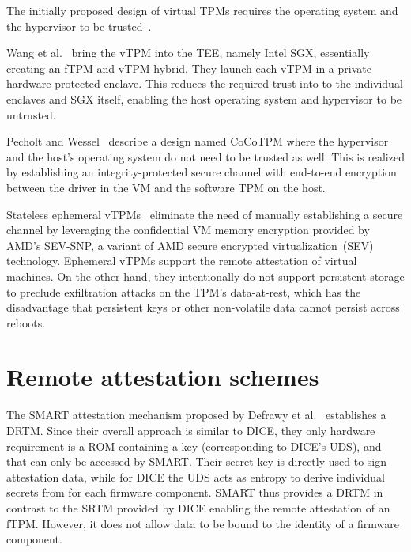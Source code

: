 The initially proposed design of virtual \acp{TPM} requires the operating system and the hypervisor to be trusted~\cite{268868}.

Wang et al.~\cite{Wang2019} bring the vTPM into the \ac{TEE}, namely Intel SGX, essentially creating an fTPM and vTPM hybrid.
They launch each vTPM in a private hardware-protected enclave.
This reduces the required trust into to the individual enclaves and SGX itself, enabling the host operating system and hypervisor to be untrusted.

Pecholt and Wessel~\cite{Pecholt2022} describe a design named CoCoTPM where the hypervisor and the host's operating system do not need to be trusted as well.
This is realized by establishing an integrity-protected secure channel with end-to-end encryption between the driver in the VM and the software TPM on the host.

Stateless ephemeral vTPMs~\cite{Narayanan2023} eliminate the need of manually establishing a secure channel by leveraging the confidential VM memory encryption provided by AMD's SEV-SNP, a variant of AMD secure encrypted virtualization~(SEV) technology.
Ephemeral vTPMs support the remote attestation of virtual machines.
On the other hand, they intentionally do not support persistent storage to preclude exfiltration attacks on the TPM's data-at-rest, which has the disadvantage that persistent keys or other non-volatile data cannot persist across reboots.

\section{Remote attestation schemes}



The SMART attestation mechanism proposed by Defrawy et al.~\cite{EURECOM+3536} establishes a \ac{DRTM}.
Since their overall approach is similar to \ac{DICE}, they only hardware requirement is a ROM containing a key (corresponding to DICE's \ac{UDS}), and that can only be accessed by SMART\@.
Their secret key is directly used to sign attestation data, while for \ac{DICE} the \ac{UDS} acts as entropy to derive individual secrets from for each firmware component.
SMART thus provides a \ac{DRTM} in contrast to the \ac{SRTM} provided by \ac{DICE} enabling the remote attestation of an \ac{fTPM}.
However, it does not allow data to be bound to the identity of a firmware component.


